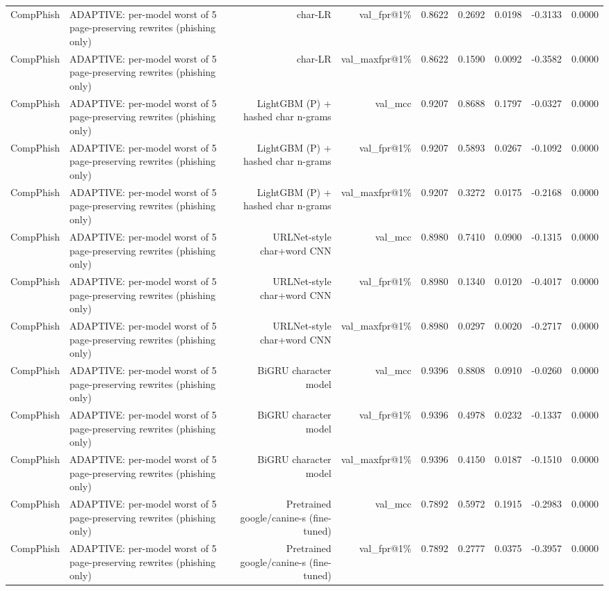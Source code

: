 \begin{table}[t]
\begin{tabular}{llrrrrrrr}
CompPhish & ADAPTIVE: per-model worst of 5 page-preserving rewrites (phishing only) & char-LR & val\_fpr@1\% & 0.8622 & 0.2692 & 0.0198 & -0.3133 & 0.0000 \\
CompPhish & ADAPTIVE: per-model worst of 5 page-preserving rewrites (phishing only) & char-LR & val\_maxfpr@1\% & 0.8622 & 0.1590 & 0.0092 & -0.3582 & 0.0000 \\
CompPhish & ADAPTIVE: per-model worst of 5 page-preserving rewrites (phishing only) & LightGBM (P) + hashed char n-grams & val\_mcc & 0.9207 & 0.8688 & 0.1797 & -0.0327 & 0.0000 \\
CompPhish & ADAPTIVE: per-model worst of 5 page-preserving rewrites (phishing only) & LightGBM (P) + hashed char n-grams & val\_fpr@1\% & 0.9207 & 0.5893 & 0.0267 & -0.1092 & 0.0000 \\
CompPhish & ADAPTIVE: per-model worst of 5 page-preserving rewrites (phishing only) & LightGBM (P) + hashed char n-grams & val\_maxfpr@1\% & 0.9207 & 0.3272 & 0.0175 & -0.2168 & 0.0000 \\
CompPhish & ADAPTIVE: per-model worst of 5 page-preserving rewrites (phishing only) & URLNet-style char+word CNN & val\_mcc & 0.8980 & 0.7410 & 0.0900 & -0.1315 & 0.0000 \\
CompPhish & ADAPTIVE: per-model worst of 5 page-preserving rewrites (phishing only) & URLNet-style char+word CNN & val\_fpr@1\% & 0.8980 & 0.1340 & 0.0120 & -0.4017 & 0.0000 \\
CompPhish & ADAPTIVE: per-model worst of 5 page-preserving rewrites (phishing only) & URLNet-style char+word CNN & val\_maxfpr@1\% & 0.8980 & 0.0297 & 0.0020 & -0.2717 & 0.0000 \\
CompPhish & ADAPTIVE: per-model worst of 5 page-preserving rewrites (phishing only) & BiGRU character model & val\_mcc & 0.9396 & 0.8808 & 0.0910 & -0.0260 & 0.0000 \\
CompPhish & ADAPTIVE: per-model worst of 5 page-preserving rewrites (phishing only) & BiGRU character model & val\_fpr@1\% & 0.9396 & 0.4978 & 0.0232 & -0.1337 & 0.0000 \\
CompPhish & ADAPTIVE: per-model worst of 5 page-preserving rewrites (phishing only) & BiGRU character model & val\_maxfpr@1\% & 0.9396 & 0.4150 & 0.0187 & -0.1510 & 0.0000 \\
CompPhish & ADAPTIVE: per-model worst of 5 page-preserving rewrites (phishing only) & Pretrained google/canine-s (fine-tuned) & val\_mcc & 0.7892 & 0.5972 & 0.1915 & -0.2983 & 0.0000 \\
CompPhish & ADAPTIVE: per-model worst of 5 page-preserving rewrites (phishing only) & Pretrained google/canine-s (fine-tuned) & val\_fpr@1\% & 0.7892 & 0.2777 & 0.0375 & -0.3957 & 0.0000 \\

\end{tabular}
\end{table}
